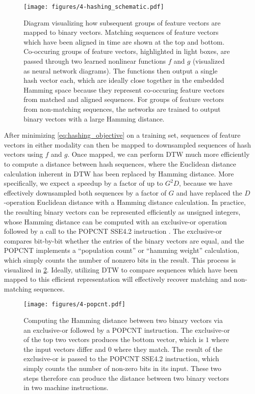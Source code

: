 \begin{figure}
  \texttt{[image: figures/4-hashing\_schematic.pdf]}
  \caption[Hashing groups of subsequent feature vectors]{Diagram visualizing how subsequent groups of feature vectors are mapped to binary vectors.
Matching sequences of feature vectors which have been aligned in time are shown at the top and bottom.
Co-occuring groups of feature vectors, highlighted in light boxes, are passed through two learned nonlinear functions $f$ and $g$ (visualized as neural network diagrams).
The functions then output a single hash vector each, which are ideally close together in the embedded Hamming space because they represent co-occuring feature vectors from matched and aligned sequences.
For groups of feature vectors from non-matching sequences, the networks are trained to output binary vectors with a large Hamming distance.}
  \label{fig:hashing_schematic}
\end{figure}

After minimizing \cref{eq:hashing_objective} on a training set, sequences of feature vectors in either modality can then be mapped to downsampled sequences of hash vectors using $f$ and $g$.
Once mapped, we can perform DTW much more efficiently to compute a distance between hash sequences, where the Euclidean distance calculation inherent in DTW has been replaced by Hamming distance.
More specifically, we expect a speedup by a factor of up to $G^2 D$, because we have effectively downsampled both sequences by a factor of $G$ and have replaced the $D$-operation Euclidean distance with a Hamming distance calculation.
In practice, the resulting binary vectors can be represented efficiently as unsigned integers, whose Hamming distance can be computed with an exclusive-or operation followed by a call to the POPCNT SSE4.2 instruction \cite{intel2007programming}.
The exclusive-or compares bit-by-bit whether the entries of the binary vectors are equal, and the POPCNT implements a ``population count'' or ``hamming weight'' calculation, which simply counts the number of nonzero bits in the result.
This process is visualized in \cref{fig:popcnt}.
Ideally, utilizing DTW to compare sequences which have been mapped to this efficient representation will effectively recover matching and non-matching sequences.

\begin{figure}
  \texttt{[image: figures/4-popcnt.pdf]}
  \caption[Computing Hamming distance with XOR and POPCNT]{Computing the Hamming distance between two binary vectors via an exclusive-or followed by a POPCNT instruction.
The exclusive-or of the top two vectors produces the bottom vector, which is $1$ where the input vectors differ and $0$ where they match.
The result of the exclusive-or is passed to the POPCNT SSE4.2 instruction, which simply counts the number of non-zero bits in its input.
These two steps therefore can produce the distance between two binary vectors in two machine instructions.}
  \label{fig:popcnt}
\end{figure}

